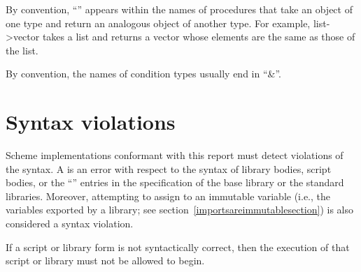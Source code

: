By convention, ``\ide{->}'' appears within the names of procedures that
take an object of one type and return an analogous object of another type.
For example, {\cf list->vector} takes a list and returns a vector whose
elements are the same as those of the list.

By convention, the names of condition types usually end in
``{\cf\&}''.

\section{Syntax violations}

Scheme implementations conformant with this report must detect
violations of the syntax.  A  is an error
with respect to the syntax of library bodies, script bodies,
or the ``\exprtype'' entries in the
specification of the base library or the standard libraries.
Moreover, attempting to assign to an immutable variable (i.e., the
variables exported by a library; see
section~\ref{importsareimmutablesection}) is also
considered a syntax violation.

If a script or library form is not syntactically correct, then the
execution of that script or library must not be allowed to begin.


